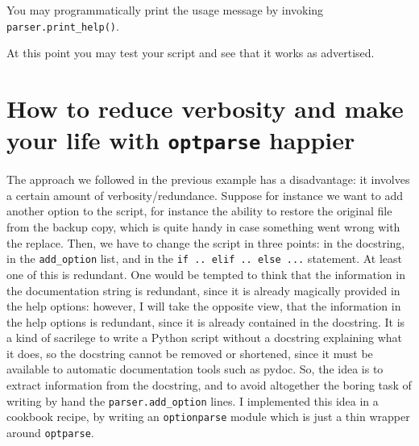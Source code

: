 \documentclass[10pt,english]{article}
\begin{document}
You may programmatically print the usage message by invoking  
\texttt{parser.print{\_}help()}.

At this point you may test your script and see that it works as
advertised.



\hypertarget{how-to-reduce-verbosity-and-make-your-life-with-optparse-happier}{}
\section*{How to reduce verbosity and make your life with \texttt{optparse} happier}

The approach we followed in the previous example has a disadvantage: 
it involves a certain amount of verbosity/redundance. Suppose for instance 
we want to add another option to the script, for instance the ability to 
restore the original file from the backup copy, which is quite handy in 
case something went wrong with the replace.
Then, we have to change the script in three points: in the docstring,
in the \texttt{add{\_}option} list, and in the \texttt{if .. elif .. else ...} 
statement. At least one of this is redundant.
One would be tempted to think that the information in the documentation
string is redundant, since it is already magically provided in the help
options: however, I will take the opposite view, that the information
in the help options is redundant, since it is already contained in
the docstring.  It is a kind of sacrilege to write a Python script 
without a docstring explaining what it does, so the docstring cannot 
be removed or shortened, since it must be available to automatic
documentation tools such as pydoc. So, the idea is to 
extract information from the docstring, and to avoid altogether 
the boring task of writing by hand the \texttt{parser.add{\_}option} lines. 
I implemented this idea in a cookbook recipe, by writing an 
\texttt{optionparse} module which is just a thin wrapper around \texttt{optparse}.
\end{document}
